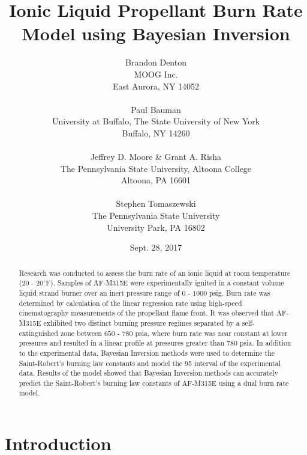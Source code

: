 \documentclass{article}
\begin{document}
\newcommand{\vect}[1]{\mathbf{#1}}

\title{Ionic Liquid Propellant Burn Rate Model using Bayesian Inversion}
\author{Brandon Denton\\
MOOG Inc.\\
East Aurora, NY 14052\\
\\
Paul Bauman\\
University at Buffalo, The State University of New York\\
Buffalo, NY 14260\\
\\
Jeffrey D. Moore \& Grant A. Risha\\
The Pennsylvania State University, Altoona College\\
Altoona, PA 16601\\
\\
Stephen Tomaszewski\\
The Pennsylvania State University\\
University Park, PA 16802}

\date{Sept. 28, 2017}

\maketitle

\begin{abstract}
Research was conducted to assess the burn rate of an ionic liquid at room temperature ($20$ - $20^{\circ}\mathrm{F}$).
Samples of AF-M315E were experimentally ignited in a constant volume liquid strand burner over an inert pressure range
of $0$ - $1000$ psig. Burn rate was determined by calculation of the linear regression rate using high-speed
cinematography measurements of the propellant flame front. It was observed that AF-M315E exhibited two distinct burning
pressure regimes separated by a self-extinguished zone between $650$ - $780$ psia, where burn rate was near constant at
lower pressures and resulted in a linear profile at pressures greater than 780 psia. In addition to the experimental data,
Bayesian Inversion methods were used to determine the Saint-Robert's burning law constants and model the 95%
interval of the experimental data. Results of the model showed that Bayesian Inversion methods can accurately predict
the Saint-Robert's burning law constants of AF-M315E using a dual burn rate model.
\end{abstract}

\section{Introduction} \label{intro}
\end{document}
